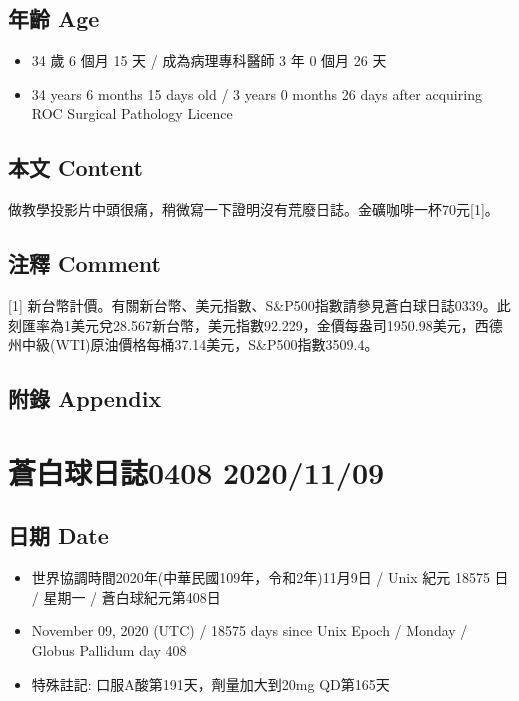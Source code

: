 \documentclass[
]{article}
\providecommand{\tightlist}{%
  \setlength{\itemsep}{0pt}\setlength{\parskip}{0pt}}
\begin{document}
\hypertarget{ux5e74ux9f61-age-5}{%
\subsection{年齡 Age}\label{ux5e74ux9f61-age-5}}

\begin{itemize}
\tightlist
\item
  34 歲 6 個月 15 天 / 成為病理專科醫師 3 年 0 個月 26 天
\item
  34 years 6 months 15 days old / 3 years 0 months 26 days after
  acquiring ROC Surgical Pathology Licence
\end{itemize}

\hypertarget{ux672cux6587-content-5}{%
\subsection{本文 Content}\label{ux672cux6587-content-5}}

做教學投影片中頭很痛，稍微寫一下證明沒有荒廢日誌。金礦咖啡一杯70元{[}1{]}。

\hypertarget{ux6ce8ux91cb-comment-5}{%
\subsection{注釋 Comment}\label{ux6ce8ux91cb-comment-5}}

{[}1{]}
新台幣計價。有關新台幣、美元指數、S\&P500指數請參見蒼白球日誌0339。此刻匯率為1美元兌28.567新台幣，美元指數92.229，金價每盎司1950.98美元，西德州中級(WTI)原油價格每桶37.14美元，S\&P500指數3509.4。

\hypertarget{ux9644ux9304-appendix-5}{%
\subsection{附錄 Appendix}\label{ux9644ux9304-appendix-5}}

\hypertarget{ux84bcux767dux7403ux65e5ux8a8c0408-20201109}{%
\section{蒼白球日誌0408
2020/11/09}\label{ux84bcux767dux7403ux65e5ux8a8c0408-20201109}}

\hypertarget{ux65e5ux671f-date-6}{%
\subsection{日期 Date}\label{ux65e5ux671f-date-6}}

\begin{itemize}
\tightlist
\item
  世界協調時間2020年(中華民國109年，令和2年)11月9日 / Unix 紀元 18575 日
  / 星期一 / 蒼白球紀元第408日
\item
  November 09, 2020 (UTC) / 18575 days since Unix Epoch / Monday /
  Globus Pallidum day 408
\item
  特殊註記: 口服A酸第191天，劑量加大到20mg QD第165天
\end{itemize}
\end{document}
